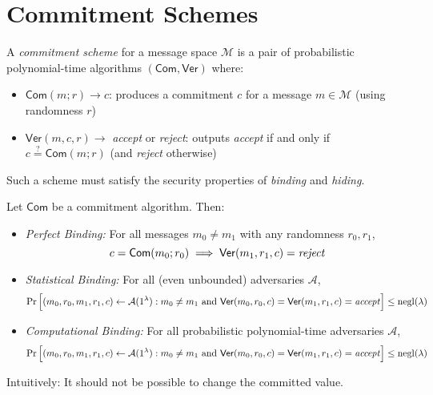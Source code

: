 \section{Commitment Schemes}

\begin{definition}
A \emph{commitment scheme} for a message space $\mathcal{M}$ is a pair of probabilistic polynomial-time algorithms $(\mathsf{Com}, \mathsf{Ver})$ where:
\begin{itemize}
    \item $\mathsf{Com}(m; r) \to c$: produces a commitment $c$ for a message $m \in \mathcal{M}$ (using randomness $r$)
    \item $\mathsf{Ver}(m,c,r) \to$ \emph{accept} or \emph{reject}: outputs \emph{accept} if and only if $c \stackrel{?}{=} \mathsf{Com}(m;r)$ (and \emph{reject} otherwise)
\end{itemize}

\noindent Such a scheme must satisfy the security properties of \emph{binding} and \emph{hiding}.
\end{definition}

\myspace

\begin{definition}[Binding]
Let $\mathsf{Com}$ be a commitment algorithm. Then:
\begin{itemize}
    \item \emph{Perfect Binding:} For all messages $m_0 \neq m_1$ with any randomness $r_0,r_1$,
    \[
    c = \mathsf{Com}(m_0 ;r_0) \implies \mathsf{Ver}(m_1,r_1,c) = \text{\emph{reject}}
    \]
    \item \emph{Statistical Binding:} For all (even unbounded) adversaries $\mathcal{A}$, \[
    \Pr\Big[
    (m_0, r_0, m_1, r_1, c) \gets \mathcal{A}(1^\lambda) : m_0 \neq m_1 \text{ and } 
    \mathsf{Ver}(m_0, r_0, c) = \mathsf{Ver}(m_1, r_1, c) = \text{\emph{accept}}
    \Big] \le \mathrm{negl}(\lambda)
    \]
    \item \emph{Computational Binding:} For all probabilistic polynomial-time adversaries $\mathcal{A}$, \[
    \Pr\Big[
    (m_0, r_0, m_1, r_1, c) \gets \mathcal{A}(1^\lambda) : m_0 \neq m_1 \text{ and } 
    \mathsf{Ver}(m_0, r_0, c) = \mathsf{Ver}(m_1, r_1, c) = \text{\emph{accept}}
    \Big] \le \mathrm{negl}(\lambda)
    \]
\end{itemize}

\noindent Intuitively: It should not be possible to change the committed value.
\end{definition} 

